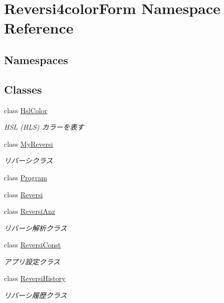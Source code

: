 \hypertarget{namespace_reversi4color_form}{}\section{Reversi4color\+Form Namespace Reference}
\label{namespace_reversi4color_form}
\subsection*{Namespaces}
\begin{DoxyCompactItemize}
\end{DoxyCompactItemize}
\subsection*{Classes}
\begin{DoxyCompactItemize}
\item 
class \hyperlink{class_reversi4color_form_1_1_hsl_color}{Hsl\+Color}
\begin{DoxyCompactList}\small\item\em H\+SL (H\+LS) カラーを表す \end{DoxyCompactList}\item 
class \hyperlink{class_reversi4color_form_1_1_my_reversi}{My\+Reversi}
\begin{DoxyCompactList}\small\item\em リバーシクラス \end{DoxyCompactList}\item 
class \hyperlink{class_reversi4color_form_1_1_program}{Program}
\item 
class \hyperlink{class_reversi4color_form_1_1_reversi}{Reversi}
\item 
class \hyperlink{class_reversi4color_form_1_1_reversi_anz}{Reversi\+Anz}
\begin{DoxyCompactList}\small\item\em リバーシ解析クラス \end{DoxyCompactList}\item 
class \hyperlink{class_reversi4color_form_1_1_reversi_const}{Reversi\+Const}
\begin{DoxyCompactList}\small\item\em アプリ設定クラス \end{DoxyCompactList}\item 
class \hyperlink{class_reversi4color_form_1_1_reversi_history}{Reversi\+History}
\begin{DoxyCompactList}\small\item\em リバーシ履歴クラス \end{DoxyCompactList}\item 

\end{DoxyCompactItemize}
